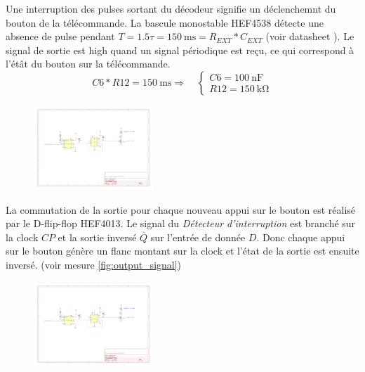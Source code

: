 \documentclass[french]{layout/Report}
\begin{document}
\begin{description}[leftmargin=!,labelwidth=4cm, labelindent=\parindent]
	\item[Détecteur d'interruption]
        Une interruption des pulses sortant du décodeur signifie un déclenchemnt du bouton de la télécommande.
        La bascule monostable HEF4538 détecte une absence de pulse pendant $T = 1.5 \tau = \SI{150}{\milli\second} = R_{EXT}*C_{EXT}$ (voir datasheet \cite{HEF4538}).
        Le signal de sortie est high quand un signal périodique est reçu, ce qui correspond à l'étât du bouton sur la télécommande.
        \begin{equation*}
            \mathit{C6}*\mathit{R12} = \SI{150}{\milli\second}
            \Rightarrow\quad
            \begin{cases}
                \mathit{C6} = \SI{100}{\nano\farad} \\
                \mathit{R12} = \SI{150}{\kilo\ohm}
            \end{cases}
        \end{equation*}

        \begin{figure}[H]
        \centering
        \includegraphics[width=0.4\textwidth]{fig/interrupt_detect.pdf}
        \end{figure}

    \item[Commutateur]
        La commutation de la sortie pour chaque nouveau appui sur le bouton est réalisé par le D-flip-flop HEF4013\cite{HEF4013}.
        Le signal du \textit{Détecteur d'interruption} est branché sur la clock $CP$ et la sortie inversé $\overline{Q}$ sur l'entrée de donnée $D$.
        Donc chaque appui sur le bouton génère un flanc montant sur la clock et l'état de la sortie est ensuite inversé.
        (voir mesure \ref{fig:output_signal})

        \begin{figure}[H]
        \centering
        \includegraphics[width=0.4\textwidth]{fig/commutator.pdf}
        \end{figure}


\end{description}
\end{document}
